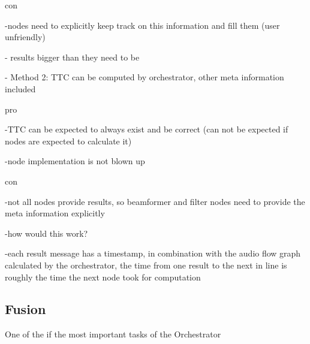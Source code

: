 con

-nodes need to explicitly keep track on this information and fill them (user unfriendly)

- results bigger than they need to be

- Method 2: TTC can be computed by orchestrator, other meta information included 

pro

-TTC can be expected to always exist and be correct (can not be expected if nodes are expected to calculate it)

-node implementation is not blown up

con

-not all nodes provide results, so beamformer and filter nodes need to provide the meta information explicitly

-how would this work?

-each result message has a timestamp, in combination with the audio flow graph calculated by the orchestrator, the time from one result to the next in line is roughly the time the next node took for computation


\subsection{Fusion}
One of the if the most important tasks of the Orchestrator
